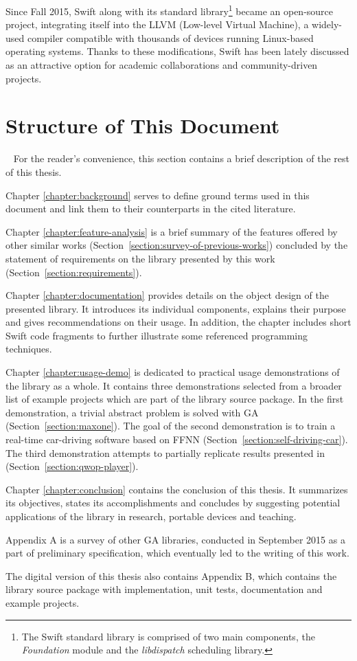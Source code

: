 Since Fall 2015, Swift along with its standard library\footnote{The Swift standard library is comprised of two main components, the \textit{Foundation} module and the \textit{libdispatch} scheduling library.} became an open-source project, integrating itself into the LLVM (Low-level Virtual Machine), a widely-used compiler compatible with thousands of devices running Linux-based operating systems. Thanks to these modifications, Swift has been lately discussed as an attractive option for academic collaborations and community-driven projects.

\section{Structure of This Document}~\label{section:structure}
For the reader's convenience, this section contains a brief description of the rest of this thesis.

Chapter \ref{chapter:background} serves to define ground terms used in this document and link them to their counterparts in the cited literature.

Chapter \ref{chapter:feature-analysis} is a brief summary of the features offered by other similar works (Section~\ref{section:survey-of-previous-works}) concluded by the statement of requirements on the library presented by this work (Section~\ref{section:requirements}).

Chapter \ref{chapter:documentation} provides details on the object design of the presented library. It introduces its individual components, explains their purpose and gives recommendations on their usage. In addition, the chapter includes short Swift code fragments to further illustrate some referenced programming techniques.

Chapter \ref{chapter:usage-demo} is dedicated to practical usage demonstrations of the library as a whole. It contains three demonstrations selected from a broader list of example projects which are part of the library source package. In the first demonstration, a trivial abstract problem is solved with GA (Section~\ref{section:maxone}). The goal of the second demonstration is to train a real-time car-driving software based on FFNN (Section~\ref{section:self-driving-car}). The third demonstration attempts to partially replicate results presented in \cite{EvolvingQwopGaits} (Section~\ref{section:qwop-player}).

Chapter \ref{chapter:conclusion} contains the conclusion of this thesis. It summarizes its objectives, states its accomplishments and concludes by suggesting potential applications of the library in research, portable devices and teaching.

Appendix A is a survey of other GA libraries, conducted in September 2015 as a part of preliminary specification, which eventually led to the writing of this work.

The digital version of this thesis also contains Appendix B, which contains the library source package with implementation, unit tests, documentation and example projects.
